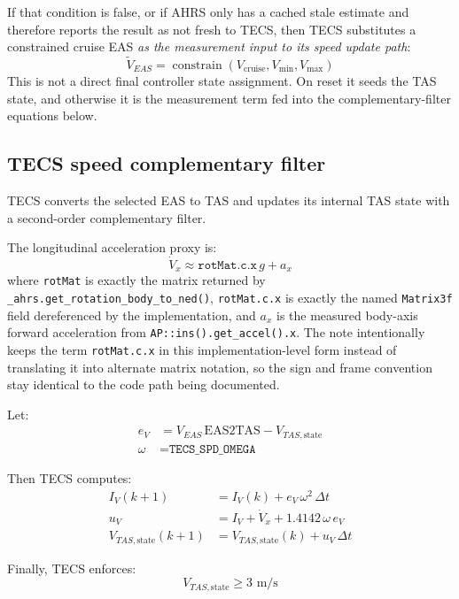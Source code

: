 \documentclass[11pt]{article}
\begin{document}
If that condition is false, or if AHRS only has a cached stale estimate and therefore reports the result as not fresh to TECS, then TECS substitutes a constrained cruise EAS \emph{as the measurement input to its speed update path}:
\begin{equation}
\tilde{V}_{EAS} = \operatorname{constrain}(V_{\text{cruise}}, V_{\min}, V_{\max})
\end{equation}
This is not a direct final controller state assignment. On reset it seeds the TAS state, and otherwise it is the measurement term fed into the complementary-filter equations below.

\subsection{TECS speed complementary filter}

TECS converts the selected EAS to TAS and updates its internal TAS state with a second-order complementary filter.

The longitudinal acceleration proxy is:
\begin{equation}
\dot{V}_x \approx \texttt{rotMat.c.x}\,g + a_x
\end{equation}
where \texttt{rotMat} is exactly the matrix returned by \texttt{\_ahrs.get\_rotation\_body\_to\_ned()}, \texttt{rotMat.c.x} is exactly the named \texttt{Matrix3f} field dereferenced by the implementation, and $a_x$ is the measured body-axis forward acceleration from \texttt{AP::ins().get\_accel().x}.
The note intentionally keeps the term \texttt{rotMat.c.x} in this implementation-level form instead of translating it into alternate matrix notation, so the sign and frame convention stay identical to the code path being documented.

Let:
\begin{align}
e_V &= V_{EAS}\,\text{EAS2TAS} - V_{TAS,\text{state}} \\
\omega &= \texttt{TECS\_SPD\_OMEGA}
\end{align}

Then TECS computes:
\begin{align}
I_V(k+1) &= I_V(k) + e_V\,\omega^2\,\Delta t \\
u_V &= I_V + \dot{V}_x + 1.4142\,\omega\,e_V \\
V_{TAS,\text{state}}(k+1) &= V_{TAS,\text{state}}(k) + u_V\,\Delta t
\end{align}

Finally, TECS enforces:
\begin{equation}
V_{TAS,\text{state}} \ge 3 \text{ m/s}
\end{equation}
\end{document}
